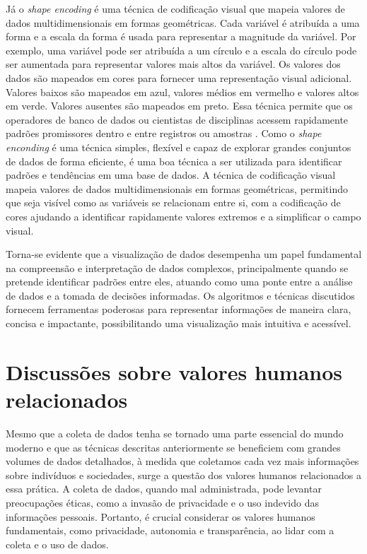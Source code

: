 Já o \textit{shape encoding} é uma técnica de codificação visual que mapeia valores de dados multidimensionais em formas geométricas. Cada variável é atribuída a uma forma e a escala da forma é usada para representar a magnitude da variável. Por exemplo, uma variável pode ser atribuída a um círculo e a escala do círculo pode ser aumentada para representar valores mais altos da variável. Os valores dos dados são mapeados em cores para fornecer uma representação visual adicional. Valores baixos são mapeados em azul, valores médios em vermelho e valores altos em verde. Valores ausentes são mapeados em preto. Essa técnica permite que os operadores de banco de dados ou cientistas de disciplinas acessem rapidamente padrões promissores dentro e entre registros ou amostras \cite{beddow:1990}. Como o \textit{shape enconding} é uma técnica simples, flexível e capaz de explorar grandes conjuntos de dados de forma eficiente, é uma boa técnica a ser utilizada para identificar padrões e tendências em uma base de dados. A técnica de codificação visual mapeia valores de dados multidimensionais em formas geométricas, permitindo que seja visível como as variáveis se relacionam entre si, com a codificação de cores ajudando a identificar rapidamente valores extremos e a simplificar o campo visual. %

{Torna-se evidente que a visualização de dados desempenha um papel fundamental na compreensão e interpretação de dados complexos, principalmente quando se pretende identificar padrões entre eles, atuando como uma ponte entre a análise de dados e a tomada de decisões informadas. Os algoritmos e técnicas discutidos fornecem ferramentas poderosas para representar informações de maneira clara, concisa e impactante, possibilitando uma visualização mais intuitiva e acessível.}


\section{Discussões sobre valores humanos relacionados}

Mesmo que a coleta de dados %
tenha se tornado uma parte essencial do mundo moderno e que as técnicas descritas anteriormente se %
beneficiem com grandes volumes de dados detalhados, à medida que coletamos cada vez mais informações sobre indivíduos e sociedades, surge a questão dos valores humanos relacionados a essa prática. A coleta de dados, quando mal administrada, pode levantar preocupações éticas, como a invasão de privacidade e o uso indevido das informações pessoais. Portanto, é crucial considerar os valores humanos fundamentais, como privacidade, autonomia e transparência, ao lidar com a coleta e o uso de dados.

